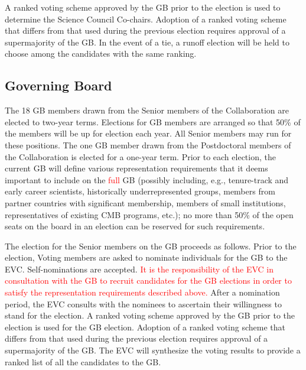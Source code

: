 \documentclass[12pt]{article}
\begin{document}
A ranked voting scheme approved by the GB prior to the election is used to determine the Science Council Co-chairs. Adoption of a ranked voting scheme that differs from that used during the previous election requires approval of a supermajority of the GB. In the event of a tie, a runoff election will be held to choose among the candidates with the same ranking.

\bigskip
\subsection{Governing Board}
\label{sec:gb-elections}

The 18 GB members drawn from the Senior members of the Collaboration are elected to two-year terms. Elections for GB members are arranged so that 50\% of the members will be up for election each year. All Senior members may run for these positions. The one GB member drawn from the Postdoctoral members of the Collaboration is elected for a one-year term. Prior to each election, the current GB will define various representation requirements that it deems important to include on the \textcolor{red}{full} GB (possibly including, e.g., tenure-track and early career scientists,  historically underrepresented groups, members from partner countries with significant membership, members of small institutions, representatives of existing CMB programs, etc.); no more than 50\% of the open seats on the board in an election can be reserved for such requirements.

The election for the Senior members on the GB proceeds as follows. 
Prior to the election, Voting members are asked to nominate individuals for the GB to the EVC. Self-nominations are accepted. \textcolor{red}{It is the responsibility of the EVC in consultation with the GB to recruit candidates for the GB elections in order to satisfy the representation requirements described above.} After a nomination period, the EVC consults with the nominees to ascertain their willingness to stand for the election. A ranked voting scheme approved by the GB prior to the election is used for the GB election. Adoption of a ranked voting scheme that differs from that used during the previous election requires approval of a supermajority of the GB. The EVC will synthesize the voting results to provide a ranked list of all the candidates to the GB. 
\end{document}
